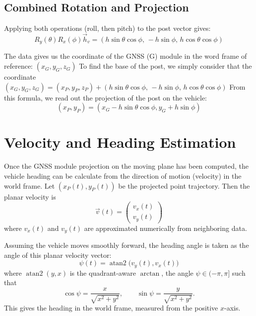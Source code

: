 \documentclass{article}
\begin{document}
\subsection{Combined Rotation and Projection}

Applying both operations (roll, then pitch) to the post vector gives:
\begin{equation}
  R_y(\theta)R_x(\phi)\vec{h}_v=(h\sin\theta\cos\phi,\,-h\sin\phi,\,h\cos\theta\cos\phi)
\end{equation}

The data gives us the coordinate of the GNSS (G) module in the word frame of reference: $(x_G, y_G, z_G)$
To find the base of the post, we simply consider that the coordinate $(x_G, y_G, z_G) = (x_P, y_P, z_P) + (h\sin\theta\cos\phi,\,-h\sin\phi,\,h\cos\theta\cos\phi)$
From this formula, we read out the projection of the post on the vehicle:
\begin{equation}
  (x_P, y_P) =  (x_G- h\sin\theta\cos\phi, y_G+ h\sin\phi)
\end{equation}

\section{Velocity and Heading Estimation}

Once the GNSS module projection on the moving plane has been computed, the vehicle
heading can be calculate from the direction of motion (velocity) in the world frame. Let
$(x_P(t), y_P(t))$ be the projected point trajectory. Then the planar velocity is
\begin{equation}
  \vec{v}(t) =
  \begin{pmatrix}
    v_x(t) \\
    v_y(t)
  \end{pmatrix}
\end{equation}
where $v_x(t)$ and $v_y(t)$ are approximated numerically from neighboring data.

Assuming the vehicle moves smoothly forward, the heading angle is taken as the angle
of this planar velocity vector:
\begin{equation}
  \psi(t) = \operatorname{atan2}\bigl(v_y(t), v_x(t)\bigr)
\end{equation}
where $\operatorname{atan2}(y,x)$ is the quadrant-aware $\arctan$, the angle $\psi \in (-\pi,\pi]$ such that
\[
\cos\psi = \frac{x}{\sqrt{x^2+y^2}},
\qquad
\sin\psi = \frac{y}{\sqrt{x^2+y^2}}.
\]
This gives the heading in the world frame, measured from the positive $x$-axis.
\end{document}
